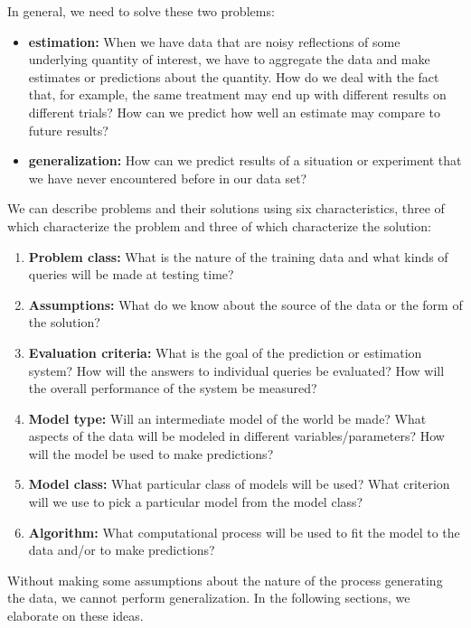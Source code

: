 In general, we need to solve these two problems:
\begin{itemize}
  \item {\bf estimation:}  When we have data that are noisy reflections
        of some underlying quantity of interest, we have to aggregate the
        data and make estimates or predictions about the quantity.
        How do we deal with the fact that, for
        example, the same treatment may end up with different results on
        different trials?  How can we predict how well an estimate may
        compare to future results?
  \item {\bf generalization:} How can we predict results of a situation
        or experiment that we have never encountered before in our data set?
\end{itemize}

We can describe problems and their solutions using six
characteristics, three of which characterize the problem and three of
which characterize the solution:
\begin{enumerate}
  \item {\bf Problem class:}  What is the nature of the training data and what
        kinds of queries will be made at testing time?
  \item {\bf Assumptions:}  What do we know about the source of the data or the form of the solution?
  \item {\bf Evaluation criteria:}  What is the goal of the prediction or estimation system?  How  will the answers to individual queries be evaluated?  How will the overall performance of the system be measured?
  \item {\bf Model type:}  Will an intermediate model of the world be made?  What aspects of the data will be modeled in different variables/parameters?  How will the model be used to make predictions? 
  \item {\bf Model class:} What particular class of models
        will be used?  What criterion will we use to pick a particular model
        from the model class?
  \item {\bf Algorithm:}  What computational process will be used to fit
        the model to the data and/or to make predictions?
\end{enumerate}
Without making some assumptions about the nature of the process
generating the data, we cannot perform generalization.  In the
following sections, we elaborate on these ideas.

